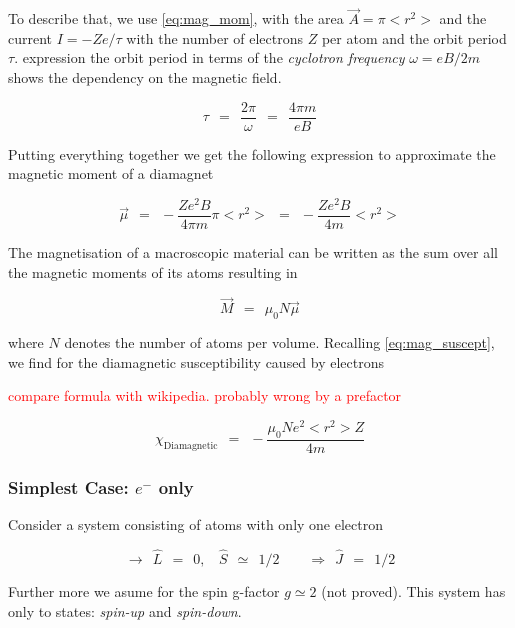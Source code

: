 \documentclass[10pt]{report}
\numberwithin{equation}{chapter}
\begin{document}
To describe that, we use \ref{eq:mag_mom}, with the area $\vec{A} = \pi <r^2>$ and the current $I = -Z e/ \tau$ with the number of electrons $Z$ per atom and the orbit period $\tau$. expression the orbit period in terms of the \textit{cyclotron frequency} $\omega = eB/2m$ shows the dependency on the magnetic field.

\begin{equation}
  \tau ~~=~~ \frac{2\pi}{\omega} ~~=~~ \frac{4\pi m}{e B}
\end{equation}

Putting everything together we get the following expression to approximate the magnetic moment of a diamagnet

\begin{equation} \label{eq:mag_mom_diamag}
  \vec{\mu} ~~=~~ -\frac{Z e^2 B}{4\pi m} \pi <r^2> ~~=~~ -\frac{Ze^2B}{4m} <r^2>
\end{equation}

The magnetisation of a macroscopic material can be written as the sum over all the magnetic moments of its atoms resulting in

\begin{equation}
  \vec{M} ~~=~~ \mu_0 N \vec{\mu}
\end{equation}

where $N$ denotes the number of atoms per volume. Recalling \ref{eq:mag_suscept}, we find for the diamagnetic susceptibility caused by electrons

\textcolor{red}{compare formula with wikipedia. probably wrong by a prefactor}

\begin{equation}
  \chi_\text{Diamagnetic} ~~=~~ -\frac{\mu_0 N e^2 <r^2> Z}{4m}
\end{equation}


\subsubsection{Simplest Case: $e^-$ only}

Consider a system consisting of atoms with only one electron

\begin{equation}
  \rightarrow ~~ \hat{L} ~~=~~0, ~~~~ \hat{S} ~~≃~~ 1/2 ~~~~~~~~~\Rightarrow ~~ \hat{J} ~~=~~ 1/2
\end{equation}

Further more we asume for the spin g-factor $g \simeq 2$ (not proved). This system has only to states: \textit{spin-up} and \textit{spin-down}.
\end{document}
